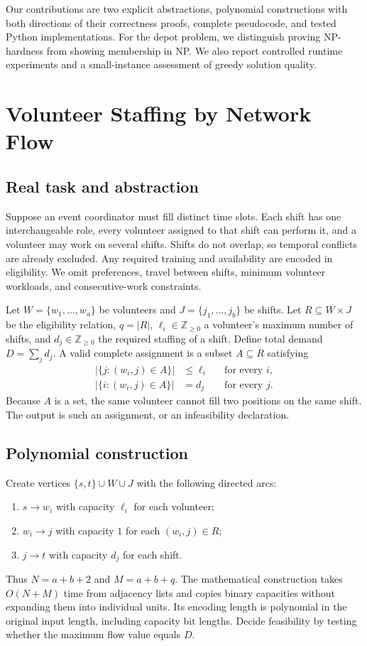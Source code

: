 \documentclass[sigconf,nonacm]{acmart}
\begin{document}
Our contributions are two explicit abstractions, polynomial constructions with
both directions of their correctness proofs, complete pseudocode, and tested
Python implementations. For the depot problem, we distinguish proving
NP-hardness from showing membership in NP. We also report controlled runtime
experiments and a small-instance assessment of greedy solution quality.

\section{Volunteer Staffing by Network Flow}
\subsection{Real task and abstraction}
Suppose an event coordinator must fill distinct time slots. Each shift has one
interchangeable role, every volunteer assigned to that shift can perform it,
and a volunteer may work on several shifts. Shifts do not overlap, so temporal
conflicts are already excluded. Any required training and availability are
encoded in eligibility. We omit preferences, travel between shifts, minimum
volunteer workloads, and consecutive-work constraints.

Let $W=\{w_1,\ldots,w_a\}$ be volunteers and
$J=\{j_1,\ldots,j_b\}$ be shifts. Let $R\subseteq W\times J$ be the
eligibility relation, $q=|R|$, $\ell_i\in\mathbb Z_{\ge0}$ a volunteer's
maximum number of shifts, and $d_j\in\mathbb Z_{\ge0}$ the required staffing
of a shift. Define total demand $D=\sum_j d_j$. A valid complete assignment is
a subset $A\subseteq R$ satisfying
\begin{align}
 |\{j:(w_i,j)\in A\}|&\le\ell_i &&\text{for every }i,\\
 |\{i:(w_i,j)\in A\}|&=d_j &&\text{for every }j.
\end{align}
Because $A$ is a set, the same volunteer cannot fill two positions on the same
shift. The output is such an assignment, or an infeasibility declaration.

\subsection{Polynomial construction}
Create vertices $\{s,t\}\cup W\cup J$ with the following directed arcs:
\begin{enumerate}
\item $s\to w_i$ with capacity $\ell_i$ for each volunteer;
\item $w_i\to j$ with capacity $1$ for each $(w_i,j)\in R$;
\item $j\to t$ with capacity $d_j$ for each shift.
\end{enumerate}
Thus $N=a+b+2$ and $M=a+b+q$. The mathematical construction takes
$O(N+M)$ time from adjacency lists and copies binary capacities without
expanding them into individual units. Its encoding length is polynomial in
the original input length, including capacity bit lengths. Decide feasibility
by testing whether the maximum flow value equals $D$.
\end{document}
